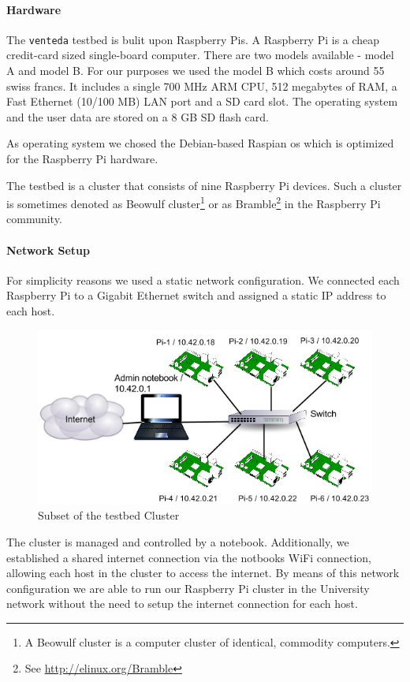 \documentclass[10pt,a4wide]{article}
\begin{document}
\paragraph{Hardware}
The \texttt{venteda} testbed is bulit upon Raspberry Pis. A Raspberry Pi is a cheap credit-card sized single-board computer. There are two models available - model A and model B. For our purposes we used the model B which costs around 55 swiss francs. It includes a single 700 MHz ARM CPU, 512 megabytes of RAM, a Fast Ethernet (10/100 MB) LAN port and a SD card slot. The operating system and the user data are stored on a 8 GB SD flash card. 

As operating system we chosed the Debian-based Raspian os which is optimized for the Raspberry Pi hardware.


The testbed is a cluster that consists of nine Raspberry Pi devices. Such a cluster is sometimes denoted as Beowulf cluster\footnote{A Beowulf cluster is a computer cluster of identical, commodity computers.} or as Bramble\footnote{See \url{http://elinux.org/Bramble}} in the Raspberry Pi community.


\paragraph{Network Setup}
For simplicity reasons we used a static network configuration. We connected each Raspberry Pi to a Gigabit Ethernet switch and assigned a static IP address to each host. 

\begin{figure}[!htb]
\includegraphics[scale=0.45]{png/pi_cluster.png} 
\centering
\caption{Subset of the testbed Cluster}
\end{figure}

The cluster is managed and controlled by a notebook. Additionally, we established a shared internet connection via the notbooks WiFi connection, allowing each host in the cluster to access the internet. 
By means of this network configuration we are able to run our Raspberry Pi cluster in the University network without the need to setup the internet connection for each host.
\end{document}

